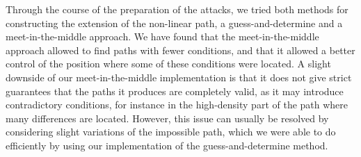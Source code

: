 Through the course of the preparation of the attacks, we tried both methods for constructing the extension of the non-linear path, \ie a guess-and-determine and a meet-in-the-middle approach.
We have found that the meet-in-the-middle approach allowed to find paths with fewer conditions, and that it allowed a better control of the position where some of these conditions were located.
A slight downside of our meet-in-the-middle implementation is that it does not give strict guarantees that the paths it produces are completely valid, as it may introduce contradictory conditions,
for instance in the high-density part of the path where many differences are located. However, this issue can usually be resolved by considering slight variations of the impossible path, which
we were able to do efficiently by using our implementation of the guess-and-determine method.

\medskip

